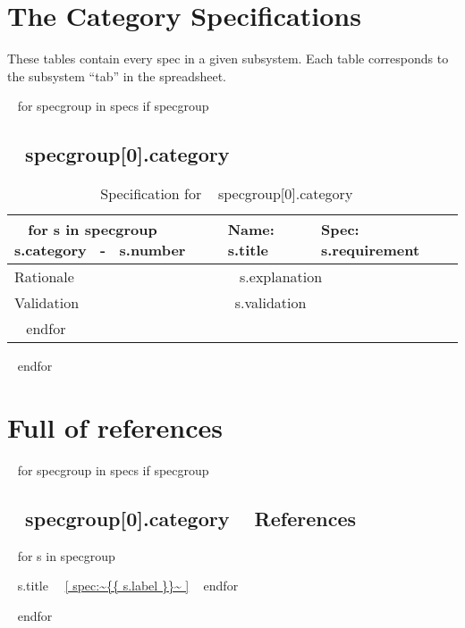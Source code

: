 \documentclass{article}
\makeatletter
\newcommand{\fixme}[1]{\todo[inline]{#1}}
\newcommand\newtag[2]{#1\def\@currentlabel{#1}\label{#2}}
\makeatother
\begin{document}
\section{The Category Specifications}

These tables contain every spec in a given subsystem. 
Each table corresponds to the subsystem ``tab'' in the spreadsheet.

~{ for specgroup in specs if specgroup }~

\subsection{~{{ specgroup[0].category }}~}

\begin{table}[htp]
  \caption{Specification for ~{{ specgroup[0].category }}~}
  \centering
  \begin{tabular}{|p{}|p{}|p{}| }
    \hline
    ~{ for s in specgroup }~
    \rowcolor{dunetablecolor}
    \newtag{~{{ s.category }}~-~{{ s.number }}~}{ spec:~{{ s.label }}~ } \fixme{~{{ s.label }}~}
    & Name: ~{{ s.title }}~  & Spec:  ~{{ s.requirement }}~ \\
    \hline
    Rationale &  \multicolumn{2}{p{0.7\textwidth}|}{ ~{{ s.explanation }}~ } \\
    \hline
    Validation & \multicolumn{2}{p{0.7\textwidth}|}{ ~{{s.validation}}~ } \\
    \hline
    ~{ endfor }~
  \end{tabular}
  \label{tab:spectable:~{{ specgroup[0].category }}~}
\end{table}

~{ endfor }~

\section{Full of references}

~{ for specgroup in specs if specgroup }~
\subsection{~{{ specgroup[0].category }}~ References}

\begin{description}
  ~{ for s in specgroup }~
  \item[ ~{{ s.category }}~ ~{{ s.number }}~ ] ~{{ s.title }}~~\ref{ spec:~{{ s.label }}~ }
  ~{ endfor }~
\end{description}
~{ endfor }~
\end{document}
